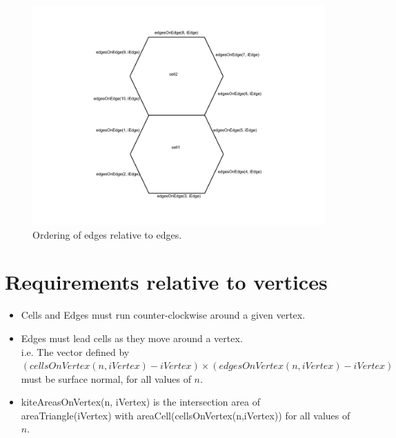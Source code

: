 \documentclass[11pt]{report}
\begin{document}
\begin{figure}[htp!]
	\centering
	\includegraphics[scale=0.4]{figures/EdgeOnEdgeDiagram.pdf}
	\caption{Ordering of edges relative to edges.}
\end{figure}

\section{Requirements relative to vertices}

\begin{itemize}
	\item Cells and Edges must run counter-clockwise around a given vertex.
	\item Edges must lead cells as they move around a vertex. \\
		  i.e. The vector defined by  \\
		  {\small $(cellsOnVertex(n, iVertex) - iVertex) \times (edgesOnVertex(n, iVertex) - iVertex)$} \\
		  must be surface normal, for all values of $n$.
	\item kiteAreasOnVertex(n, iVertex) is the intersection area of areaTriangle(iVertex) with areaCell(cellsOnVertex(n,iVertex)) for all values of $n$.
\end{itemize}
\end{document}
